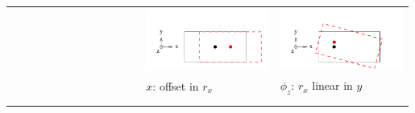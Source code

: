 \documentclass[compress]{beamer}
\begin{document}
\begin{frame}
\begin{center}
    \begin{tabular}{p{0.33\linewidth} p{0.33\linewidth} p{0.33\linewidth}}
      \begin{minipage}{\linewidth}
      \end{minipage} &
      \begin{minipage}{\linewidth}
	\includegraphics[width=0.8\linewidth]{dof_x}
      \end{minipage} &
      \begin{minipage}{\linewidth}
	\hspace{-0.8 cm}
	\includegraphics[width=0.8\linewidth]{dof_phiz}
      \end{minipage} \\
      \begin{minipage}{\linewidth}
      \end{minipage} &
      \begin{minipage}{\linewidth}
	\hspace{0.4 cm}
	\small $x$: offset in $r_x$
      \end{minipage} &
      \begin{minipage}{\linewidth}
	\hspace{-0.6 cm}
	\small $\phi_z$: $r_x$ linear in $y$
      \end{minipage} \\
      & & \\
      \begin{minipage}{\linewidth}

\end{minipage}
\end{tabular}
\end{center}
\end{frame}
\end{document}
